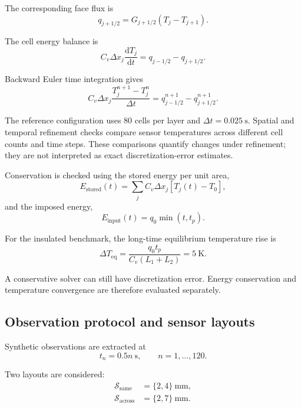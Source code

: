 \documentclass[11pt,a4paper]{article}
\newcommand{\dd}{\mathrm{d}}
\begin{document}
The corresponding face flux is
\begin{equation}
q_{j+1/2}=G_{j+1/2}(T_j-T_{j+1}).
\end{equation}

The cell energy balance is
\begin{equation}
C_v\Delta x_j\frac{\dd T_j}{\dd t}
=
q_{j-1/2}-q_{j+1/2}.
\end{equation}

Backward Euler time integration gives
\begin{equation}
C_v\Delta x_j
\frac{T_j^{n+1}-T_j^n}{\Delta t}
=
q_{j-1/2}^{n+1}-q_{j+1/2}^{n+1}.
\end{equation}

The reference configuration uses 80 cells per layer and
$\Delta t=0.025~\mathrm{s}$.
Spatial and temporal refinement checks compare sensor
temperatures across different cell counts and time steps.
These comparisons quantify changes under refinement;
they are not interpreted as exact discretization-error
estimates.

Conservation is checked using the stored energy per unit area,
\begin{equation}
E_{\mathrm{stored}}(t)
=
\sum_j C_v\Delta x_j[T_j(t)-T_0],
\end{equation}
and the imposed energy,
\begin{equation}
E_{\mathrm{input}}(t)=q_0\min(t,t_p).
\end{equation}

For the insulated benchmark, the long-time equilibrium
temperature rise is
\begin{equation}
\Delta T_{\mathrm{eq}}
=
\frac{q_0t_p}{C_v(L_1+L_2)}
=
5~\mathrm{K}.
\end{equation}

A conservative solver can still have discretization error.
Energy conservation and temperature convergence are therefore
evaluated separately.

\subsection{Observation protocol and sensor layouts}

Synthetic observations are extracted at
\begin{equation}
t_n=0.5n~\mathrm{s},
\qquad n=1,\ldots,120.
\end{equation}

Two layouts are considered:
\begin{align}
\mathcal{S}_{\mathrm{same}}
  &=\{2,4\}~\mathrm{mm},\\
\mathcal{S}_{\mathrm{across}}
  &=\{2,7\}~\mathrm{mm}.
\end{align}
\end{document}
